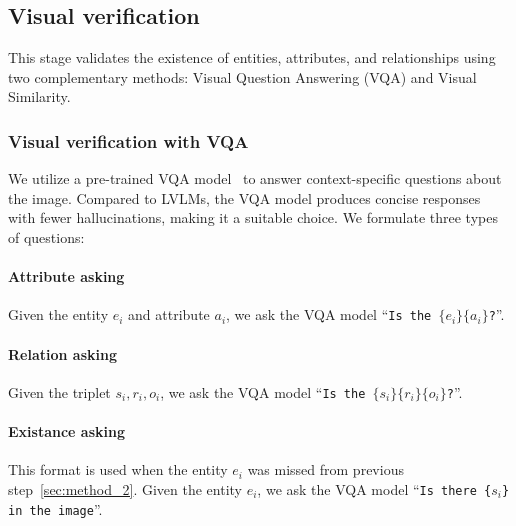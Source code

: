 \subsection{Visual verification}


This stage validates the existence of entities, attributes, and relationships using two complementary methods: Visual Question Answering (VQA) and Visual Similarity.



\subsubsection{Visual verification with VQA}

We utilize a pre-trained VQA model~\cite{li2023blip}  to answer context-specific questions about the image. Compared to LVLMs, the VQA model produces concise responses with fewer hallucinations, making it a suitable choice. We formulate three types of questions:

\paragraph{Attribute asking} Given the entity $e_i$ and attribute $a_i$, we ask the VQA model ``\texttt{Is the $\{e_i\} \{a_i\}$?}''.

\paragraph{Relation asking} Given the triplet $s_i,r_i,o_i$, we ask the VQA model ``\texttt{Is the $\{s_i\} \{r_i\} \{o_i\}$?}''.

\paragraph{Existance asking} This format is used when the entity $e_i$ was missed from previous step~\ref{sec:method_2}. Given the entity $e_i$, we ask the VQA model ``\texttt{Is there \{$s_i$\} in the image}''.

